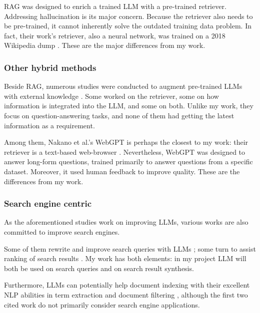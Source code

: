 \documentclass[final-report]{report-template}
\begin{document}
RAG was designed to enrich a trained LLM with a pre-trained retriever.
Addressing hallucination is its major concern. Because the retriever also
needs to be pre-trained, it cannot inherently solve the outdated training data
problem. In fact, their work's retriever, also a neural network, was trained on
a 2018 Wikipedia dump \cite[Section 3]{rag}.  These are the major differences
from my work.

\subsubsection{Other hybrid methods}
Beside RAG, numerous studies were conducted to augment pre-trained LLMs with
external knowledge \cite{hybrid.method.1, hybrid.method.2, hybrid.method.3,
hybrid.method.4, webgpt}.
Some worked on the retriever, some on how information is integrated into the
LLM, and some on both. Unlike my work, they focus on question-answering
tasks, and none of them had getting the latest information as a requirement.

Among them, Nakano et al.'s WebGPT is perhaps the closest to my work: their
retriever is a text-based web-browser \cite{webgpt}. Nevertheless, WebGPT was
designed to answer long-form questions, trained primarily to answer questions
from a specific dataset. Moreover, it used human feedback to improve quality.
These are the differences from my work.

\subsubsection{Search engine centric}
As the aforementioned studies work on improving LLMs, various works are also
committed to improve search engines. 

Some of them rewrite and improve search queries with LLMs
\cite{query.rewriting.1, query.rewriting.2}; some turn to assist ranking of
search results \cite{search.result.rerank.1, search.result.rerank.1}. My work
has both elements: in my project LLM will both be used on search queries and
on search result synthesis.

Furthermore, LLMs can potentially help document indexing with their excellent
NLP abilities in term extraction \cite{llm.term.extraction.1,
llm.term.extraction.2} and document filtering \cite{llm.indexing.filter},
although the first two cited work do not primarily consider search engine
applications. 
\end{document}
